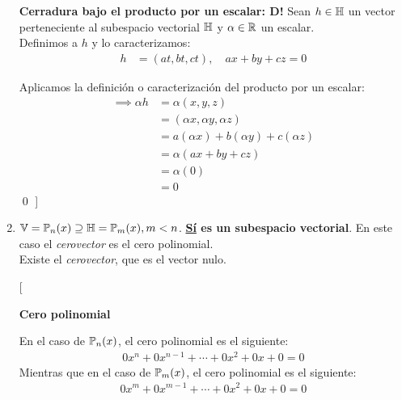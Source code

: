 \begin{enumerate}
\begin{note}
        \textbf{Cerradura bajo el producto por un escalar: D!} Sean $h \in \mathbb{H}$ un vector perteneciente al subespacio vectorial $\mathbb{H}$ y $\alpha \in \mathbb{R}$ un escalar. \\ Definimos a $h$ y lo caracterizamos:
        \begin{align*}
            h &= (at, bt, ct), \quad ax + by + cz = 0
        \end{align*}

        Aplicamos la definición o caracterización del producto por un escalar:
        \begin{align*}
            \implies \alpha h &= \alpha (x, y, z) \\
            &= (\alpha x, \alpha y, \alpha z) \\
            &= a(\alpha x) + b(\alpha y) + c(\alpha z) \\
            &= \alpha (ax + by + cz) \\
            &= \alpha (0) \\
            &= 0
        \end{align*}\qed
    ]
    \end{note}

    \item $\mathbb{V} = \mathbb{P}_n(x) \supseteq \mathbb{H} = \mathbb{P}_m(x), m < n$. \textbf{\underline{Sí} es un subespacio vectorial}. En este caso el \textit{cerovector} es el cero polinomial. \\
        \checkmark Existe el \textit{cerovector}, que es el vector nulo. \\
            \begin{note}
                [
                    \begin{center}
                        \textbf{Cero polinomial}
                    \end{center}

                    \vspace*{1em}

                    En el caso de $\mathbb{P}_n(x)$, el cero polinomial es el siguiente:
                    \begin{align*}
                        0x^n + 0x^{n-1} + \cdots + 0x^2 + 0x + 0 = 0
                    \end{align*}
                    Mientras que en el caso de $\mathbb{P}_m(x)$, el cero polinomial es el siguiente:
                    \begin{align*}
                        0x^m + 0x^{m-1} + \cdots + 0x^2 + 0x + 0 = 0
                    \end{align*}


\end{note}
\end{enumerate}
